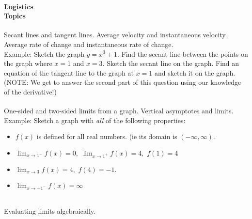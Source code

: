 \documentclass[11pt,fleqn]{article}
\begin{document}
\renewcommand{\headrulewidth}{0pt}
\newcommand{\blank}[1]{\rule{#1}{0.75pt}}
\newcommand{\bc}{\begin{center}}
\newcommand{\ec}{\end{center}}
\renewcommand{\d}{\displaystyle}

\vspace*{-0.7in}

\begin{center}
  \large
  \\
\end{center}
\noindent\textbf{Logistics}\\

\noindent\textbf{Topics}\\

\noindent {}\\
Secant lines and tangent lines. Average velocity and instantaneous velocity. Average rate of change and instantaneous rate of change.\\

Example: Sketch the graph $y=x^3+1.$ Find the secant line between the points on the graph where $x=1$ and $x=3.$ Sketch  the secant line on the graph. Find an equation of the tangent line to the graph at $x=1$ and sketch it on the graph. (NOTE: We get to answer the second part of this question using our knowledge of the derivative!) \\

\noindent {}\\
One-sided and two-sided limits from a graph. Vertical asymptotes and limits.\\

Example: Sketch a graph with \emph{all} of the following properties: \\
\begin{itemize}
\item $f(x)$ is defined for all real numbers. (ie its domain is $(-\infty,\infty).$
\item $\lim_{x \to 1^-} f(x) = 0,$ $\lim_{x \to 1^+} f(x) =4,$ $f(1) =4$
\item $\lim_{x \to 3} f(x) =4,$ $f(4)=-1.$
\item $\lim_{x \to -1^-} f(x) =\infty$
\end{itemize}


\noindent {}\\
Evaluating limits algebraically.\\
\end{document}
